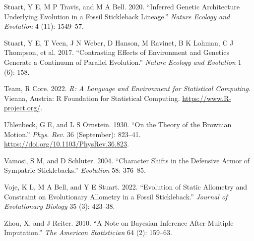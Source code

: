 \documentclass[
  12pt,
]{article}
\newlength{\cslhangindent}
\newlength{\cslentryspacingunit} %
\newenvironment{CSLReferences}[2] %
 {%
  \setlength{\parindent}{0pt}
  \ifodd #1
  \let\oldpar\par
  \def\par{\hangindent=\cslhangindent\oldpar}
  \fi
  \setlength{\parskip}{#2\cslentryspacingunit}
 }%
 {}
\begin{document}
\begin{CSLReferences}{1}{0}
\leavevmode{}%
Stuart, Y E, M P Travis, and M A Bell. 2020. {``Inferred Genetic
Architecture Underlying Evolution in a Fossil Stickleback Lineage.''}
\emph{Nature Ecology and Evolution} 4 (11): 1549--57.

\leavevmode{}%
Stuart, Y E, T Veen, J N Weber, D Hanson, M Ravinet, B K Lohman, C J
Thompson, et al. 2017. {``Contrasting Effects of Environment and
Genetics Generate a Continuum of Parallel Evolution.''} \emph{Nature
Ecology and Evolution} 1 (6): 158.

\leavevmode{}%
Team, R Core. 2022. \emph{R: A Language and Environment for Statistical
Computing}. Vienna, Austria: R Foundation for Statistical Computing.
\url{https://www.R-project.org/}.

\leavevmode{}%
Uhlenbeck, G E, and L S Ornstein. 1930. {``On the Theory of the Brownian
Motion.''} \emph{Phys. Rev.} 36 (September): 823--41.
\url{https://doi.org/10.1103/PhysRev.36.823}.

\leavevmode{}%
Vamosi, S M, and D Schluter. 2004. {``Character Shifts in the Defensive
Armor of Sympatric Sticklebacks.''} \emph{Evolution} 58: 376--85.

\leavevmode{}%
Voje, K L, M A Bell, and Y E Stuart. 2022. {``Evolution of Static
Allometry and Constraint on Evolutionary Allometry in a Fossil
Stickleback.''} \emph{Journal of Evolutionary Biology} 35 (3): 423--38.

\leavevmode{}%
Zhou, X, and J Reiter. 2010. {``A Note on Bayesian Inference After
Multiple Imputation.''} \emph{The American Statistician} 64 (2):
159--63.

\end{CSLReferences}
\end{document}
